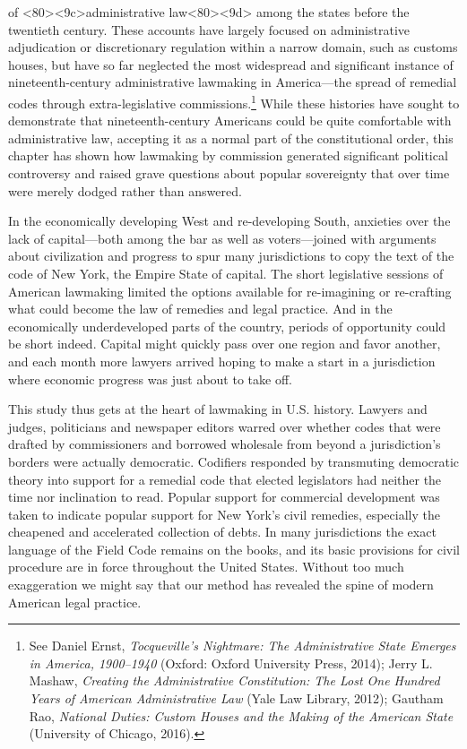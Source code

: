 \documentclass[12pt,]{article}
\let\rmarkdownfootnote\footnote%
\def\footnote{\protect\rmarkdownfootnote}
\begin{document}
of \textless80\textgreater\textless9c\textgreater administrative
law\textless80\textgreater\textless9d\textgreater{} among the states
before the twentieth century. These accounts have largely focused on
administrative adjudication or discretionary regulation within a narrow
domain, such as customs houses, but have so far neglected the most
widespread and significant instance of nineteenth-century administrative
lawmaking in America---the spread of remedial codes through
extra-legislative commissions.\footnote{See Daniel Ernst,
  \emph{Tocqueville's Nightmare: The Administrative State Emerges in
  America, 1900--1940} (Oxford: Oxford University Press, 2014); Jerry L.
  Mashaw, \emph{Creating the Administrative Constitution: The Lost One
  Hundred Years of American Administrative Law} (Yale Law Library,
  2012); Gautham Rao, \emph{National Duties: Custom Houses and the
  Making of the American State} (University of Chicago, 2016).} While
these histories have sought to demonstrate that nineteenth-century
Americans could be quite comfortable with administrative law, accepting
it as a normal part of the constitutional order, this chapter has shown
how lawmaking by commission generated significant political controversy
and raised grave questions about popular sovereignty that over time were
merely dodged rather than answered.

In the economically developing West and re-developing South, anxieties
over the lack of capital---both among the bar as well as voters---joined
with arguments about civilization and progress to spur many
jurisdictions to copy the text of the code of New York, the Empire State
of capital. The short legislative sessions of American lawmaking limited
the options available for re-imagining or re-crafting what could become
the law of remedies and legal practice. And in the economically
underdeveloped parts of the country, periods of opportunity could be
short indeed. Capital might quickly pass over one region and favor
another, and each month more lawyers arrived hoping to make a start in a
jurisdiction where economic progress was just about to take off.

This study thus gets at the heart of lawmaking in U.S. history. Lawyers
and judges, politicians and newspaper editors warred over whether codes
that were drafted by commissioners and borrowed wholesale from beyond a
jurisdiction's borders were actually democratic. Codifiers responded by
transmuting democratic theory into support for a remedial code that
elected legislators had neither the time nor inclination to read.
Popular support for commercial development was taken to indicate popular
support for New York's civil remedies, especially the cheapened and
accelerated collection of debts. In many jurisdictions the exact
language of the Field Code remains on the books, and its basic
provisions for civil procedure are in force throughout the United
States. Without too much exaggeration we might say that our method has
revealed the spine of modern American legal practice.
\end{document}
